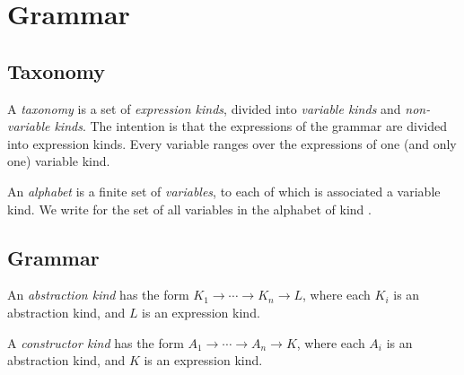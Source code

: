 \documentclass[envcountsame]{llncs}
\begin{document}
\section{Grammar}


\subsection{Taxonomy}

A \emph{taxonomy} is a set of \emph{expression kinds}, divided into \emph{variable kinds} and \emph{non-variable kinds}.
The intention is that the expressions of the grammar are divided into expression kinds.  Every
variable ranges over the expressions of one (and only one) variable kind.


An \emph{alphabet} is a finite set of \emph{variables}, to each of which is associated a variable kind.  We write   
for the set of all variables in the alphabet  of kind .


\subsection{Grammar}

\begin{definition}
\label{df:kinds}
An \emph{abstraction kind} has the form $K_1 \rightarrow \cdots \rightarrow K_n \rightarrow L$,
where each $K_i$ is an abstraction kind, and $L$ is an expression kind.

A \emph{constructor kind} has the form $A_1 \rightarrow \cdots \rightarrow A_n \rightarrow K$,
where each $A_i$ is an abstraction kind, and $K$ is an expression kind.
\end{definition}
\end{document}
